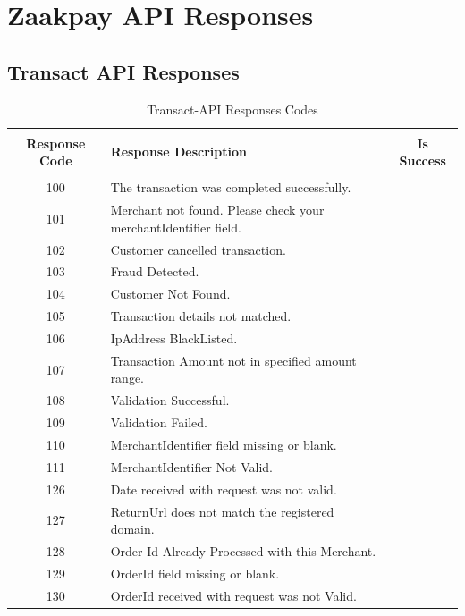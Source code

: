 \documentclass{article}
\newcommand{\cmark}{\ding{51}}
\newcommand{\xmark}{\ding{55}}
\begin{document}
\section{Zaakpay API Responses}
\subsection{Transact API Responses}

\begin{longtable}{||c|p{12.5cm}||c|}
\rowcolor{white}
\caption{Transact-API Responses Codes}\\
\rowcolor{green!50}
\bfseries{Response Code} & \bfseries{Response Description} & \bfseries{Is Success} \\ \hline & & \\
100 &The transaction was completed successfully.& \textcolor{green} {\cmark} \\
101 &Merchant not found. Please check your merchantIdentifier field.& \textcolor{red} {\xmark} \\
102 &Customer cancelled transaction.& \textcolor{red} {\xmark} \\
103 &Fraud Detected.& \textcolor{red} {\xmark} \\
104 &Customer Not Found.& \textcolor{red} {\xmark} \\
105 &Transaction details not matched.& \textcolor{red} {\xmark} \\
106 &IpAddress BlackListed.& \textcolor{red} {\xmark} \\
107 &Transaction Amount not in specified amount range.& \textcolor{red} {\xmark} \\
108 &Validation Successful.& \textcolor{red} {\xmark} \\
109 &Validation Failed.& \textcolor{red} {\xmark} \\
110 &MerchantIdentifier field missing or blank.& \textcolor{red} {\xmark} \\
111 &MerchantIdentifier Not Valid.& \textcolor{red} {\xmark} \\
126 &Date received with request was not valid.& \textcolor{red} {\xmark} \\
127 &ReturnUrl does not match the registered domain.& \textcolor{red} {\xmark} \\
128 &Order Id Already Processed with this Merchant.& \textcolor{red} {\xmark} \\
129 &OrderId field missing or blank.& \textcolor{red} {\xmark} \\
130 &OrderId received with request was not Valid.& \textcolor{red} {\xmark} \\

\end{longtable}
\end{document}
